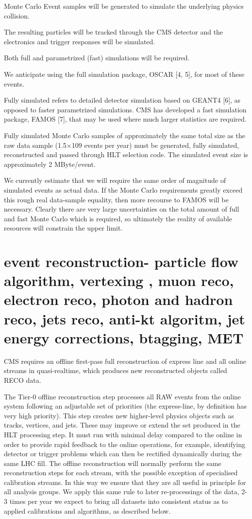 Monte Carlo Event samples will be generated to simulate the underlying physics collision.

The resulting particles will be tracked through the CMS detector and the electronics and trigger
responses will be simulated.

Both full and parametrized (fast) simulations will be required.

We anticipate using the full simulation package, OSCAR [4, 5], for most of these events.

Fully
simulated refers to detailed detector simulation based on GEANT4 [6], as opposed to faster
parametrized simulations. CMS has developed a fast simulation package, FAMOS [7], that may
be used where much larger statistics are required.

Fully simulated Monte Carlo samples of approximately the same total size as the raw data sample (1.5×109 events per year) must be generated, fully simulated, reconstructed and passed through HLT selection code. The simulated \pp event size is approximately 2 MByte/event.


We currently estimate that we will require the same order of magnitude of simulated events as actual data. If the Monte Carlo requirements greatly exceed this rough real data-sample equality, then more recourse to FAMOS will be necessary. Clearly there are very large uncertainties on the total amount of full and fast Monte Carlo which is required, so ultimately the reality of available resources will constrain the upper limit.




\section{event reconstruction- particle flow algorithm, vertexing , muon reco, electron reco, photon and hadron reco, jets reco, anti-kt algoritm, jet energy corrections, btagging, MET  }


CMS requires an offline first-pass full reconstruction of express line and all
online streams in quasi-realtime, which produces new reconstructed objects
called RECO data.


The Tier-0 offline reconstruction step processes all RAW events from the online system following
an adjustable set of priorities (the express-line, by definition has very high priority). This step
creates new higher-level physics objects such as tracks, vertices, and jets. These may improve or
extend the set produced in the HLT processing step. It must run with minimal delay compared
to the online in order to provide rapid feedback to the online operations, for example, identifying
detector or trigger problems which can then be rectified dynamically during the same LHC fill.
The offline reconstruction will normally perform the same reconstruction steps for each stream,
with the possible exception of specialised calibration streams. In this way we ensure that they
are all useful in principle for all analysis groups. We apply this same rule to later re-processings
of the data, 2-3 times per year we expect to bring all datasets into consistent status as to applied
calibrations and algorithms, as described below.





